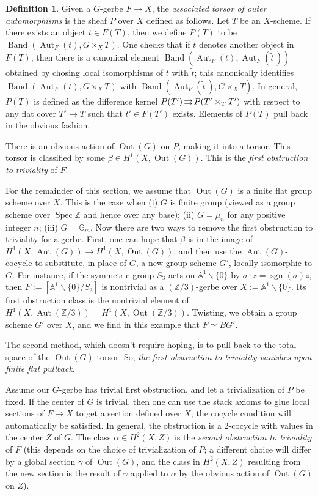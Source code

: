 \documentclass[12pt]{amsart}
\newcommand{\Z}{{\mathbb Z}}
\newcommand{\G}{{\mathbb G}}
\newcommand{\A}{{\mathbb A}}
\newcommand{\toto}{\operatornamewithlimits{\rightrightarrows}}
\DeclareMathOperator{\Spec}{Spec}
\DeclareMathOperator{\sgn}{sgn}
\DeclareMathOperator{\Out}{Out}
\DeclareMathOperator{\Aut}{Aut}
\DeclareMathOperator{\band}{Band}
\theoremstyle{plain}
\theoremstyle{definition}
\newtheorem  {defn} [thm] {Definition}
\theoremstyle{remark}
\begin{document}
\begin{defn}
Given a $G$-gerbe $F\to X$,
the {\it associated torsor of outer automorphisms}
is the sheaf $P$ over $X$ defined as follows.
Let $T$ be an $X$-scheme.
If there exists an object $t\in F(T)$, then we define
$P(T)$ to be
$\band(\Aut_F(t), G\times_XT)$. One checks that if $\tilde t$ denotes
another object in
$F(T)$, then there is a canonical element $\band(\Aut_F(t),\Aut_F(\tilde
t\,))$ obtained by chosing local isomorphisms of $t$ with $\tilde t$; this
canonically identifies $\band(\Aut_F(t), G\times_XT)$ with
$\band(\Aut_F(\tilde t\,), G\times_XT)$.
In general, $P(T)$ is defined as the difference kernel
$P(T')\toto P(T'\times_TT')$ with respect to any
flat cover $T'\to T$ such that $t'\in F(T')$ exists.
%
Elements of $P(T)$ pull back in the obvious fashion.
\end{defn}

There is an obvious action of $\Out(G)$ on $P$, making it into a torsor.
This torsor is
classified by some $\beta\in H^1(X,\Out(G))$.
This is the {\it first obstruction to triviality} of $F$. 

For the remainder of this section,
we assume that $\Out(G)$ is a finite flat group
scheme over $X$.
This is the case when (i) $G$ is finite group
(viewed as a group scheme over $\Spec\Z$ and hence over any base);
(ii) $G=\mu_n$ for any positive integer $n$;
(iii) $G=\G_m$.
Now there are two ways to remove the first obstruction to triviality
for a gerbe.
First, one can hope that $\beta$ is in the image of
$H^1(X,\Aut(G))\to H^1(X,\Out(G))$, and then use the $\Aut(G)$-cocycle
to substitute, in place of $G$, a new group scheme $G'$,
locally isomorphic to $G$.
For instance, if the symmetric group $S_3$ acts on
$\A^1\smallsetminus\{0\}$
by $\sigma\cdot z = \sgn(\sigma)z$, then
$F:=[\A^1\smallsetminus\{0\}/S_3]$ is nontrivial as a $(\Z/3)$-gerbe over
$X:=\A^1\smallsetminus\{0\}$.
Its first obstruction class is the nontrivial element of
$H^1(X,\Aut(\Z/3))=H^1(X,\Out(\Z/3))$.
Twisting, we obtain a group scheme $G'$ over $X$, and we
find in this example that $F\simeq BG'$.

The second method, which doesn't require hoping, is to pull back
to the total space of the $\Out(G)$-torsor.
So,
{\it the first obstruction to triviality vanishes upon finite flat pullback}.

Assume our $G$-gerbe has trivial first obstruction, and let a
trivialization of $P$ be fixed. If the center of $G$ is trivial,
then one can use
the stack axioms to glue local sections of $F\to X$ to get a section defined
over $X$; the cocycle condition will automatically be satisfied.
In general, the obstruction is a 2-cocycle with values in the center $Z$
of $G$.
The class $\alpha\in H^2(X,Z)$ is the {\it second obstruction
to triviality} of $F$
(this depends on the choice of trivialization of $P$; a different
choice will differ by a
global section $\gamma$ of $\Out(G)$, and
the class in $H^2(X,Z)$ resulting from
the new section is the result of $\gamma$ applied to $\alpha$ by the
obvious action of $\Out(G)$ on $Z$).
\end{document}
